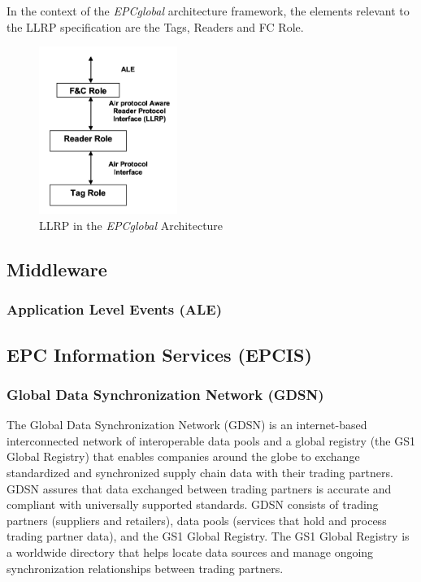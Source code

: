 In the context of the \emph{EPCglobal} architecture framework, the elements relevant to the LLRP specification are the Tags, Readers and \gls{FC} Role.

\begin{figure}[!ht]
    \centering
    \includegraphics[width=0.4\textwidth]{./assets/02-state-of-the-art/llrp-interaction}
    \caption{\gls{LLRP} in the \emph{EPCglobal} Architecture~\cite{Llrp1standard20101013Pdf}} 
    \label{fig:02:llrp-interaction}
\end{figure}






\subsection{Middleware}

\subsubsection{Application Level Events (ALE)}

\subsection{EPC Information Services (EPCIS)}

\subsubsection{Global Data Synchronization Network (GDSN)}

The Global Data Synchronization Network (GDSN) is an internet-based
interconnected network of interoperable data pools and a global registry (the GS1 Global Registry) that enables companies around the globe to exchange standardized and synchronized supply chain data with their trading partners. GDSN assures that data exchanged between trading partners is accurate and compliant with universally supported standards. GDSN consists of trading partners (suppliers and retailers), data pools (services that hold and process trading partner data), and the GS1 Global Registry. The GS1 Global Registry is a worldwide directory that helps locate data sources and manage ongoing synchronization relationships between trading partners. 

